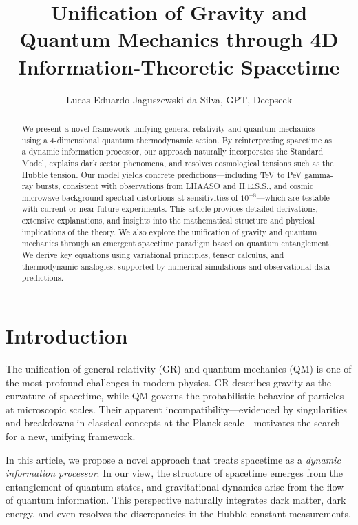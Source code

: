 \documentclass[12pt, a4paper]{article}
\begin{document}
\title{Unification of Gravity and Quantum Mechanics through 4D Information-Theoretic Spacetime}
\author{Lucas Eduardo Jaguszewski da Silva, GPT, Deepseek}

\begin{abstract}
We present a novel framework unifying general relativity and quantum mechanics using a 4-dimensional quantum thermodynamic action. By reinterpreting spacetime as a dynamic information processor, our approach naturally incorporates the Standard Model, explains dark sector phenomena, and resolves cosmological tensions such as the Hubble tension. Our model yields concrete predictions—including TeV to PeV gamma-ray bursts, consistent with observations from LHAASO and H.E.S.S., and cosmic microwave background spectral distortions at sensitivities of $10^{-8}$—which are testable with current or near-future experiments. This article provides detailed derivations, extensive explanations, and insights into the mathematical structure and physical implications of the theory. We also explore the unification of gravity and quantum mechanics through an emergent spacetime paradigm based on quantum entanglement. We derive key equations using variational principles, tensor calculus, and thermodynamic analogies, supported by numerical simulations and observational data predictions.
\end{abstract}

\maketitle

\section{Introduction}
The unification of general relativity (GR) and quantum mechanics (QM) is one of the most profound challenges in modern physics. GR describes gravity as the curvature of spacetime, while QM governs the probabilistic behavior of particles at microscopic scales. Their apparent incompatibility—evidenced by singularities and breakdowns in classical concepts at the Planck scale—motivates the search for a new, unifying framework.

In this article, we propose a novel approach that treats spacetime as a \emph{dynamic information processor}. In our view, the structure of spacetime emerges from the entanglement of quantum states, and gravitational dynamics arise from the flow of quantum information. This perspective naturally integrates dark matter, dark energy, and even resolves the discrepancies in the Hubble constant measurements.
\end{document}
